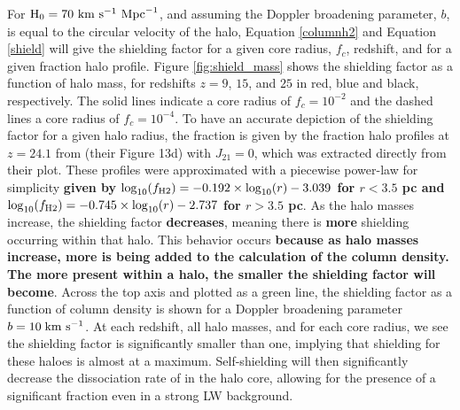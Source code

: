 \documentclass[fleqn,usenatbib]{mnras}
\begin{document}
For $\rm{H}_{0} = 70 \ \rm{km} \ \rm{s}^{-1} \ \rm{Mpc}^{-1}$, and assuming the Doppler broadening parameter, $b$, is equal to the circular velocity of the halo, Equation \ref{columnh2} and Equation \ref{shield} will give the shielding factor for a given core radius, $f_{c}$, redshift, and for a given \hh{} fraction halo profile. Figure \ref{fig:shield_mass} shows the shielding factor as a function of halo mass, for redshifts $z = 9$, $15$, and $25$ in red, blue and black, respectively. The solid lines indicate a core radius of $f_{c} = 10^{-2}$ and the dashed lines a core radius of $f_{c} = 10^{-4}$. To have an accurate depiction of the shielding factor for a given halo radius, the \hh{} fraction is given by the \hh{} fraction halo profiles at $z = 24.1$ from \citet{OShea08} (their Figure 13d) with $J_{21} = 0$, which was extracted directly from their plot. These profiles were approximated with a piecewise power-law for simplicity \textbf{given by $\log_{10}(f_{\rm H2}) = -0.192 \times \log_{10}(r) - 3.039$ for $r < 3.5$ pc and $\log_{10}(f_{\rm H2}) = -0.745 \times \log_{10}(r) - 2.737$ for $r > 3.5$ pc}. 
As the halo masses increase, the shielding factor \textbf{decreases}, meaning there is \textbf{more} shielding occurring within that halo. This behavior occurs \textbf{because as halo masses increase, more \hh{} is being added to the calculation of the column density. The more \hh{} present within a halo, the smaller the shielding factor will become}. Across the top axis and plotted as a green line, the shielding factor as a function of \hh{} column density is shown for a Doppler broadening parameter $ b = 10 \kms$. At each redshift, all halo masses, and for each core radius, we see the shielding factor is significantly smaller than one, implying that \hh{} shielding for these haloes is almost at a maximum. Self-shielding will then significantly decrease the dissociation rate of \hh{} in the halo core, allowing for the presence of a significant \hh{} fraction even in a strong LW background.
\end{document}
